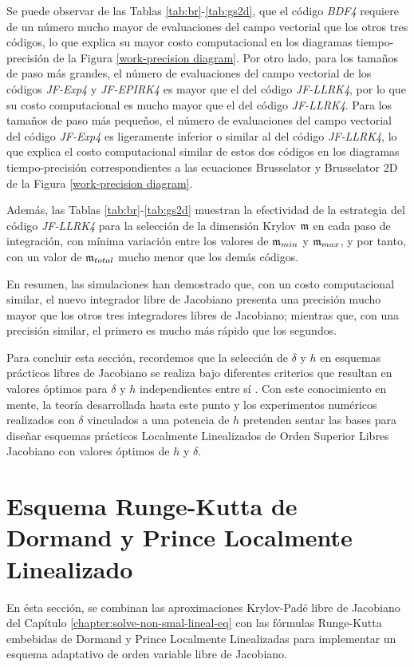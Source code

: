 Se puede observar de las Tablas \ref{tab:br}-\ref{tab:gs2d}, que el código \textit{BDF4} requiere de un número mucho mayor de evaluaciones del campo vectorial que los otros tres códigos, lo que explica su mayor costo computacional en los diagramas tiempo-precisión de la Figura \ref{work-precision diagram}. Por otro lado, para los tamaños de paso más grandes, el número de evaluaciones del campo vectorial de los códigos \textit{JF-Exp4} y \textit{JF-EPIRK4} es mayor que el del código \textit{JF-LLRK4}, por lo que su costo computacional es mucho mayor que el del código \textit{JF-LLRK4}. Para los tamaños de paso más pequeños, el número de evaluaciones del campo vectorial del código \textit{JF-Exp4} es ligeramente inferior o similar al del código \textit{JF-LLRK4}, lo que explica el costo computacional similar de estos dos códigos en los diagramas tiempo-precisión correspondientes a las ecuaciones Brusselator y Brusselator 2D de la Figura \ref{work-precision diagram}.

Además, las Tablas \ref{tab:br}-\ref{tab:gs2d} muestran la efectividad de la estrategia del código \textit{JF-LLRK4} para la selección de la dimensión Krylov $\mathfrak{m}$ en cada paso de integración, con mínima variación entre los valores de $\mathfrak{m}_{min}$ y $\mathfrak{m}_{max}$, y por tanto, con un valor de $\mathfrak{m}_{total}$ mucho menor que los demás códigos.

En resumen, las simulaciones han demostrado que, con un costo computacional similar, el nuevo integrador libre de Jacobiano presenta una precisión mucho mayor que los otros tres integradores libres de Jacobiano; mientras que, con una precisión similar, el primero es mucho más rápido que los segundos.

Para concluir esta sección, recordemos que la selección de $\delta$ y $h$ en esquemas prácticos libres de Jacobiano se realiza bajo diferentes criterios que resultan en valores óptimos para $\delta$ y $h$ independientes entre sí \cite{knoll2004jacobian}. Con este conocimiento en mente, la teoría desarrollada hasta este punto y los experimentos numéricos realizados con $\delta$ vinculados a una potencia de $h$ pretenden sentar las bases para diseñar esquemas prácticos Localmente Linealizados de Orden Superior Libres Jacobiano con valores óptimos de $h$ y $\delta$.

\section{Esquema Runge-Kutta de Dormand y Prince Localmente Linealizado}
En ésta sección, se combinan las aproximaciones Krylov-Padé libre de Jacobiano del Capítulo \ref{chapter:solve-non-smal-lineal-eq} con las fórmulas Runge-Kutta embebidas de Dormand y Prince Localmente Linealizadas para implementar un esquema adaptativo de orden variable libre de Jacobiano.

